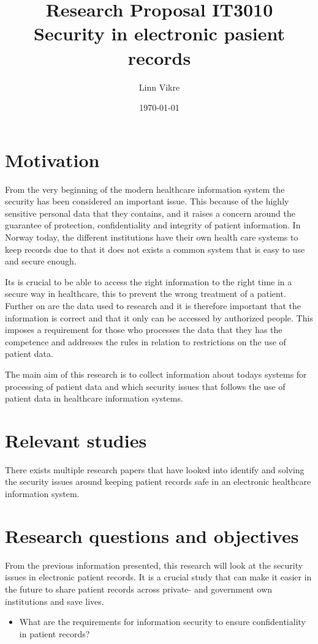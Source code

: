 \documentclass[11pt, a4paper]{article}
\title{Research Proposal IT3010\\ Security in electronic pasient records}
\author{Linn Vikre}
\date{\today}
\begin{document}
\maketitle
\section{Motivation}
From the very beginning of the modern healthcare information system the security has been considered an important issue. This because of the highly sensitive personal data that they contains, and it raises a concern around the guarantee of protection, confidentiality and integrity of patient information\cite{Smith199939}. In Norway today, the different institutions have their own health care systems to keep records due to that it does not exists a common system that is easy to use and secure enough.

Its is crucial to be able to access the right information to the right time in a secure way in healthcare, this to prevent the wrong treatment of a patient. Further on are the data used to research and it is therefore important that the information is correct and that it only can be accessed by authorized people. This imposes a requirement for those who processes the data that they has the competence and addresses the rules in relation to restrictions on the use of patient data\cite{faxvaag2007er}. 

The main aim of this research is to collect information about todays systems for processing of patient data and which security issues that follows the use of patient data in healthcare information systems.

\section{Relevant studies}

There exists multiple research papers that have looked into identify and solving the security issues around keeping patient records safe in an electronic healthcare information system. 

\section{Research questions and objectives}

From the previous information presented, this research will look at the security issues in electronic patient records. It is a crucial study that can make it easier in the future to share patient records across private- and government own institutions and save lives. 

\begin{itemize}
\item What are the requirements for information security to ensure confidentiality in patient records?
\end{itemize}


\end{document}
